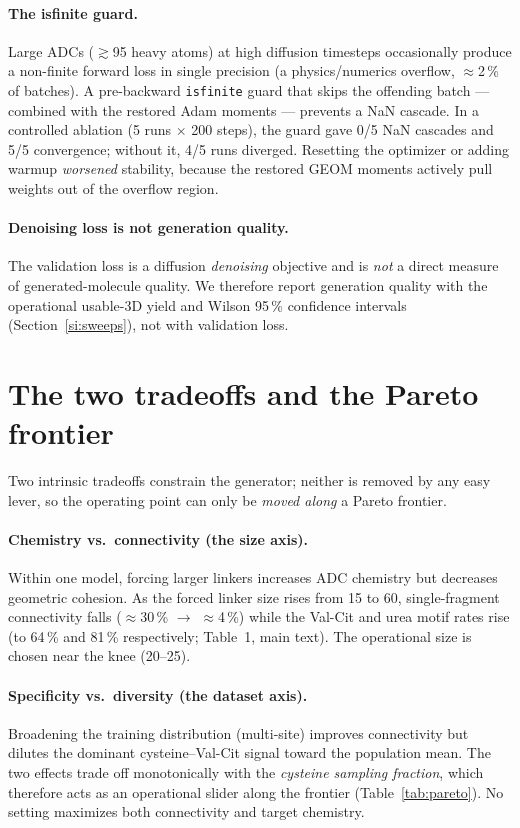 \documentclass[10pt]{article}
\begin{document}
\paragraph{The isfinite guard.}
Large ADCs ($\gtrsim$95 heavy atoms) at high diffusion timesteps occasionally produce a non-finite
forward loss in single precision (a physics/numerics overflow, $\approx$2\,\% of batches). A pre-backward
\texttt{isfinite} guard that skips the offending batch --- combined with the restored Adam moments ---
prevents a NaN cascade. In a controlled ablation (5 runs $\times$ 200 steps), the guard gave 0/5 NaN
cascades and 5/5 convergence; without it, 4/5 runs diverged. Resetting the optimizer or adding warmup
\emph{worsened} stability, because the restored GEOM moments actively pull weights out of the overflow
region.

\paragraph{Denoising loss is not generation quality.}
The validation loss is a diffusion \emph{denoising} objective and is \emph{not} a direct measure of
generated-molecule quality. We therefore report generation quality with the operational usable-3D yield
and Wilson 95\,\% confidence intervals (Section~\ref{si:sweeps}), not with validation loss.

\section{The two tradeoffs and the Pareto frontier}
\label{si:pareto}

Two intrinsic tradeoffs constrain the generator; neither is removed by any easy lever, so the operating
point can only be \emph{moved along} a Pareto frontier.

\paragraph{Chemistry vs.\ connectivity (the size axis).}
Within one model, forcing larger linkers increases ADC chemistry but decreases geometric cohesion. As the
forced linker size rises from 15 to 60, single-fragment connectivity falls ($\approx$30\,\%
$\rightarrow$ $\approx$4\,\%) while the Val-Cit and urea motif rates rise (to 64\,\% and 81\,\%
respectively; Table~1, main text). The operational size is chosen near the knee (20--25).

\paragraph{Specificity vs.\ diversity (the dataset axis).}
Broadening the training distribution (multi-site) improves connectivity but dilutes the dominant
cysteine--Val-Cit signal toward the population mean. The two effects trade off monotonically with the
\emph{cysteine sampling fraction}, which therefore acts as an operational slider along the frontier
(Table~\ref{tab:pareto}). No setting maximizes both connectivity and target chemistry.
\end{document}
